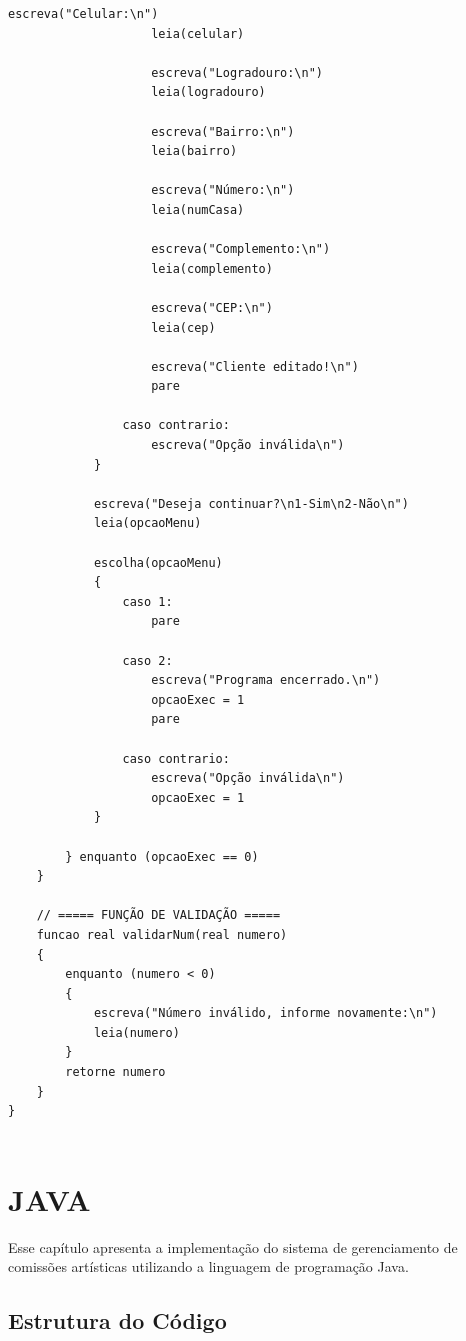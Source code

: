 \begin{lstlisting}[caption={Clasee programa em Portugol}, label={lst:programa_portugol}]
                    escreva("Celular:\n")
                    leia(celular)

                    escreva("Logradouro:\n")
                    leia(logradouro)

                    escreva("Bairro:\n")
                    leia(bairro)

                    escreva("Número:\n")
                    leia(numCasa)

                    escreva("Complemento:\n")
                    leia(complemento)

                    escreva("CEP:\n")
                    leia(cep)

                    escreva("Cliente editado!\n")
                    pare

                caso contrario:
                    escreva("Opção inválida\n")
            }

            escreva("Deseja continuar?\n1-Sim\n2-Não\n")
            leia(opcaoMenu)

            escolha(opcaoMenu)
            {
                caso 1:
                    pare

                caso 2:
                    escreva("Programa encerrado.\n")
                    opcaoExec = 1
                    pare

                caso contrario:
                    escreva("Opção inválida\n")
                    opcaoExec = 1
            }

        } enquanto (opcaoExec == 0)
    }

    // ===== FUNÇÃO DE VALIDAÇÃO =====
    funcao real validarNum(real numero)
    {
        enquanto (numero < 0)
        {
            escreva("Número inválido, informe novamente:\n")
            leia(numero)
        }
        retorne numero
    }
}


\end{lstlisting}

\chapter{JAVA}
Esse capítulo apresenta a implementação do sistema de gerenciamento de 
comissões artísticas utilizando a linguagem de programação Java. 

\section{Estrutura do Código}

